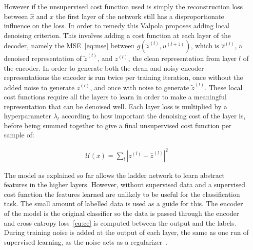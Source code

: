 \documentclass[12pt,a4paper,twoside,openright]{report}
\begin{document}
However if the unsupervised cost function used is simply the reconstruction loss between $\hat{x}$ and $x$ the first layer of the network still has a disproportionate
influence on the loss. In order to remedy this Valpola proposes adding local denoising criterion. This involves adding a cost function at each layer of the decoder,
namely the MSE~\eqref{eq:mse} between $g(\tilde{z}^{(l)}, u^{(l+1)})$, which is $\hat{z}^{(l)}$, a denoised representation of $\tilde{z}^{(l)}$, and $z^{(l)}$, the clean 
representation from layer $l$ of the encoder. In order to generate both the clean and noisy encoder representations the encoder is run twice per training iteration,
once without the added noise to generate $z^{(l)}$, and once with noise to generate $\tilde{z}^{(l)}$. These local cost functions require all the layers to learn in order
to make a meaningful representation that can be denoised well. Each layer loss is multiplied by a hyperparameter $\lambda_{l}$ according to how important the denoising cost
of the layer is, before being summed together to give a final unsupervised cost function per sample of:

\begin{align}
  \mathcal{U}(x) = \sum_{l} |z^{(l)} - \hat{z}^{(l)}|^{2}
\end{align}

The model as explained so far allows the ladder network to learn abstract features in the higher layers. However, without supervised data and a supervised cost function the 
features learned are unlikely to be useful for the classification task. The small amount of labelled data is used as a guide for this. The encoder of the model is the 
original classifier so the data is passed through the encoder and cross entropy loss~\eqref{eq:ce} is computed between the output and the labels. During training noise is 
added at the output of each layer, the same as one run of supervised learning, as the noise acts as a regularizer~\cite{NoiseInj}.
\end{document}
